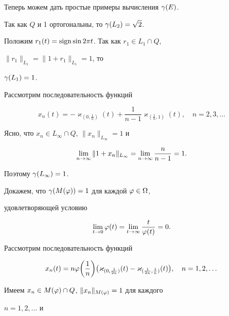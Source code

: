 Теперь можем дать простые примеры вычисления $\gamma (E)$. 


Так как $Q$ и 1 ортогональны, то $\gamma(L_2) = \sqrt 2$. 





Положим $r_1 (t) = \operatorname{sign}\sin 2\pi t$. Так как $r_1 \in L_1 \cap Q$, 


$\|r_1\|_{L_1} = \|1 + r_1\|_{L_1} =1$, то


$\gamma(L_1) =1$. 





Рассмотрим последовательность функций


$$


x_n (t) = -\varkappa_{(0, \frac 1 n)} (t)


+ \frac 1 {n-1} \varkappa_{(\frac 1 n, 1)} (t), 


\quad n=2,3, \dotsc


$$


Ясно, что $x_n \in L_\infty \cap Q$, $\|x_n\|_{L_\infty} =1$ и


$$


\liml{n \to \infty} \|1 + x_n\|_{L_\infty} = \liml{n \to \infty} 


\frac n {n-1} =1. 


$$


Поэтому $\gamma (L_\infty) =1$. 





Докажем, что $\gamma (M(\varphi)) =1$ для каждой $\varphi\in \Omega$,


удовлетворяющей условию


$$


\liml{t \to 0} \ph(t) = \liml{t \to \infty} \frac t {\ph(t)} =0.


$$


Рассмотрим последовательность функций


$$


x_n (t) = n \ph\bigg(\frac  1 n \bigg) \big( \varkappa_{(0,\frac 1 {2n})} 


(t)- 


\varkappa_{(\frac 1 {2n}, \frac 1 n)}(t)\big), \quad n=1,2, \dotsc


$$


Имеем $x_n \in M(\varphi) \cap Q$, $\|x_n\|_{M(\varphi)} =1$ для каждого


$n=1,2, \dotsc$ и


